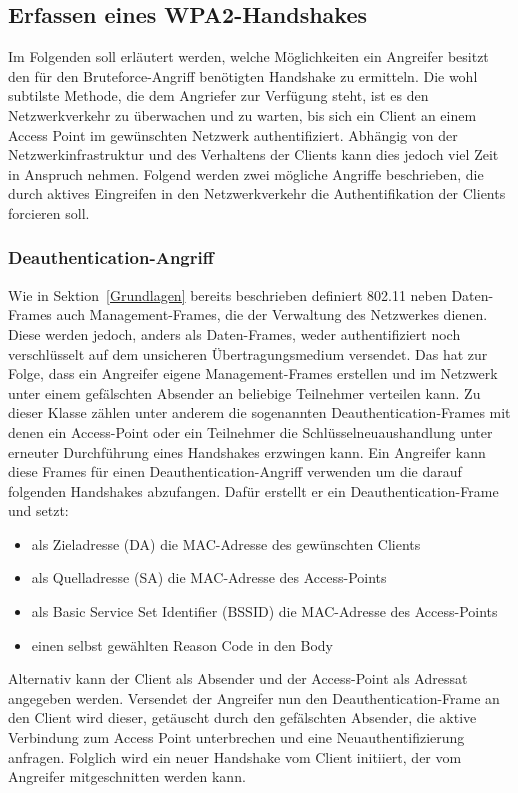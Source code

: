 \subsection{Erfassen eines WPA2-Handshakes}
Im Folgenden soll erläutert werden, welche Möglichkeiten ein Angreifer besitzt den für den Bruteforce-Angriff benötigten Handshake zu ermitteln. 
Die wohl subtilste Methode, die dem Angriefer zur Verfügung steht, ist es den Netzwerkverkehr zu überwachen und zu warten, bis sich ein Client an einem Access Point im gewünschten Netzwerk authentifiziert. 
Abhängig von der Netzwerkinfrastruktur und des Verhaltens der Clients kann dies jedoch viel Zeit in Anspruch nehmen.
Folgend werden zwei mögliche Angriffe beschrieben, die durch aktives Eingreifen in den Netzwerkverkehr die Authentifikation der Clients forcieren soll.

\subsubsection{Deauthentication-Angriff}
Wie in Sektion~\ref{Grundlagen} bereits beschrieben definiert 802.11 neben Daten-Frames auch Management-Frames, die der Verwaltung des Netzwerkes dienen.
Diese werden jedoch, anders als Daten-Frames, weder authentifiziert noch verschlüsselt auf dem unsicheren Übertragungsmedium versendet.
Das hat zur Folge, dass ein Angreifer eigene Management-Frames erstellen und im Netzwerk unter einem gefälschten Absender an beliebige Teilnehmer verteilen kann.
Zu dieser Klasse zählen unter anderem die sogenannten Deauthentication-Frames mit denen ein Access-Point oder ein Teilnehmer die Schlüsselneuaushandlung unter erneuter Durchführung eines Handshakes erzwingen kann.
Ein Angreifer kann diese Frames für einen Deauthentication-Angriff verwenden um die darauf folgenden Handshakes abzufangen.
Dafür erstellt er ein Deauthentication-Frame und setzt:
\begin{itemize}
	\item als Zieladresse (DA) die MAC-Adresse des gewünschten Clients
	\item als Quelladresse (SA) die MAC-Adresse des Access-Points
	\item als Basic Service Set Identifier (BSSID) die MAC-Adresse des Access-Points
	\item einen selbst gewählten Reason Code in den Body
\end{itemize}
Alternativ kann der Client als Absender und der Access-Point als Adressat angegeben werden.
Versendet der Angreifer nun den Deauthentication-Frame an den Client wird dieser, getäuscht durch den gefälschten Absender, die aktive Verbindung zum Access Point unterbrechen und eine Neuauthentifizierung anfragen.
Folglich wird ein neuer Handshake vom Client initiiert, der vom Angreifer mitgeschnitten werden kann.

